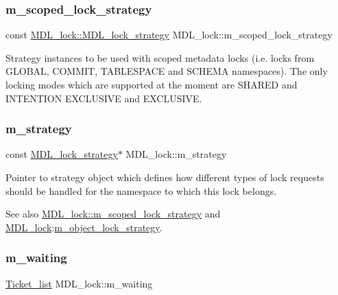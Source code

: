 \subsubsection{\texorpdfstring{m\+\_\+scoped\+\_\+lock\+\_\+strategy}{m\_scoped\_lock\_strategy}}
{\footnotesize\ttfamily const \mbox{\hyperlink{structMDL__lock_1_1MDL__lock__strategy}{M\+D\+L\+\_\+lock\+::\+M\+D\+L\+\_\+lock\+\_\+strategy}} M\+D\+L\+\_\+lock\+::m\+\_\+scoped\+\_\+lock\+\_\+strategy\hspace{0.3cm}{\ttfamily [static]}}

Strategy instances to be used with scoped metadata locks (i.\+e. locks from G\+L\+O\+B\+AL, C\+O\+M\+M\+IT, T\+A\+B\+L\+E\+S\+P\+A\+CE and S\+C\+H\+E\+MA namespaces). The only locking modes which are supported at the moment are S\+H\+A\+R\+ED and I\+N\+T\+E\+N\+T\+I\+ON E\+X\+C\+L\+U\+S\+I\+VE and E\+X\+C\+L\+U\+S\+I\+VE. \mbox{\label{classMDL__lock_a67a214605da83d57ac8d69c1f1c4854d}} 
\subsubsection{\texorpdfstring{m\+\_\+strategy}{m\_strategy}}
{\footnotesize\ttfamily const \mbox{\hyperlink{structMDL__lock_1_1MDL__lock__strategy}{M\+D\+L\+\_\+lock\+\_\+strategy}}$\ast$ M\+D\+L\+\_\+lock\+::m\+\_\+strategy}

Pointer to strategy object which defines how different types of lock requests should be handled for the namespace to which this lock belongs. \begin{DoxySeeAlso}{See also}
\mbox{\hyperlink{classMDL__lock_aed7a092b4b9aa426597f599feb6bb19b}{M\+D\+L\+\_\+lock\+::m\+\_\+scoped\+\_\+lock\+\_\+strategy}} and \mbox{\hyperlink{classMDL__lock}{M\+D\+L\+\_\+lock}}\+:\mbox{\hyperlink{classMDL__lock_a6ed94b58baea6bf2e22b76566aa513b3}{m\+\_\+object\+\_\+lock\+\_\+strategy}}. 
\end{DoxySeeAlso}
\mbox{\label{classMDL__lock_a4443cad6b484e2af5c816949ddb209dc}} 
\subsubsection{\texorpdfstring{m\+\_\+waiting}{m\_waiting}}
{\footnotesize\ttfamily \mbox{\hyperlink{classMDL__lock_1_1Ticket__list}{Ticket\+\_\+list}} M\+D\+L\+\_\+lock\+::m\+\_\+waiting}


